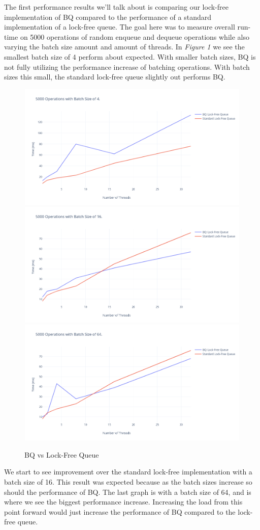 \setcounter{subsection}{0}
The first performance results we'll talk about is comparing our lock-free implementation of BQ compared to the performance of a standard implementation of a lock-free queue. The goal here was to measure overall run-time on 5000 operations of random enqueue and dequeue operations while also varying the batch size amount and amount of threads. In \textit{Figure 1} we see the smallest batch size of 4 perform about expected. With smaller batch sizes, BQ is not fully utilizing the performance increase of batching operations. With batch sizes this small, the standard lock-free queue slightly out performs BQ. 

\begin{figure}[htp]

\centering
\includegraphics[height=6cm, width=13cm]{images/imgB64.png}\hfill
\includegraphics[height=6cm, width=13cm]{images/imgB16.png}\hfill
\newpage
\includegraphics[height=6cm, width=13cm]{images/imgB4.png}\hfill

\caption{BQ vs Lock-Free Queue}
\label{fig:figure3}
\end{figure}
We start to see improvement over the standard lock-free implementation with a
batch size of 16. This result was expected because as the batch sizes increase so should the performance of BQ. The last graph is with a batch size of 64, and is where we see the biggest performance increase. Increasing the load from this point forward would just increase the performance of BQ compared to the lock-free queue. 